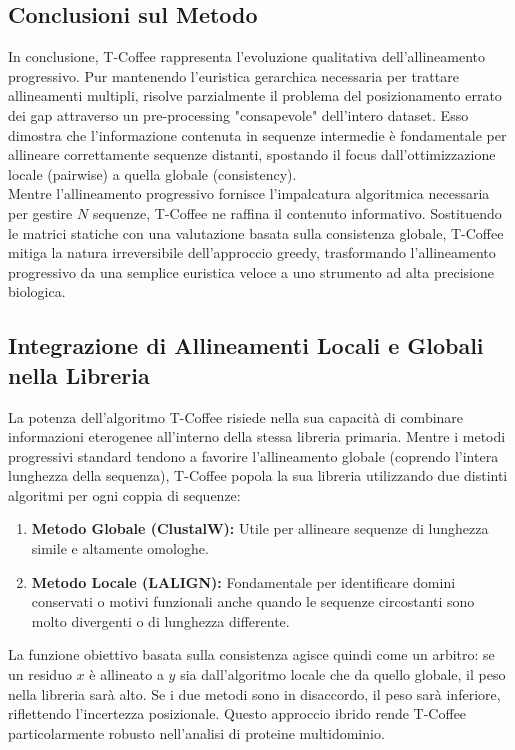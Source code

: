 \subsection{Conclusioni sul Metodo}
In conclusione, T-Coffee rappresenta l'evoluzione qualitativa dell'allineamento progressivo. Pur mantenendo l'euristica gerarchica necessaria per trattare allineamenti multipli, risolve parzialmente il problema del posizionamento errato dei gap attraverso un pre-processing "consapevole" dell'intero dataset. Esso dimostra che l'informazione contenuta in sequenze intermedie è fondamentale per allineare correttamente sequenze distanti, spostando il focus dall'ottimizzazione locale (pairwise) a quella globale (consistency). \\
Mentre l'allineamento progressivo fornisce l'impalcatura algoritmica necessaria per gestire $N$ sequenze, T-Coffee ne raffina il contenuto informativo. Sostituendo le matrici statiche con una valutazione basata sulla consistenza globale, T-Coffee mitiga la natura irreversibile dell'approccio greedy, trasformando l'allineamento progressivo da una semplice euristica veloce a uno strumento ad alta precisione biologica.

\subsection{Integrazione di Allineamenti Locali e Globali nella Libreria}
\label{subsec:tcoffee_local_global}
La potenza dell'algoritmo T-Coffee risiede nella sua capacità di combinare informazioni eterogenee all'interno della stessa libreria primaria. Mentre i metodi progressivi standard tendono a favorire l'allineamento globale (coprendo l'intera lunghezza della sequenza), T-Coffee popola la sua libreria utilizzando due distinti algoritmi per ogni coppia di sequenze:
\begin{enumerate}
    \item \textbf{Metodo Globale (ClustalW):} Utile per allineare sequenze di lunghezza simile e altamente omologhe.
    \item \textbf{Metodo Locale (LALIGN):} Fondamentale per identificare domini conservati o motivi funzionali anche quando le sequenze circostanti sono molto divergenti o di lunghezza differente.
\end{enumerate}
La funzione obiettivo basata sulla consistenza agisce quindi come un arbitro: se un residuo $x$ è allineato a $y$ sia dall'algoritmo locale che da quello globale, il peso nella libreria sarà alto. Se i due metodi sono in disaccordo, il peso sarà inferiore, riflettendo l'incertezza posizionale. Questo approccio ibrido rende T-Coffee particolarmente robusto nell'analisi di proteine multidominio.

